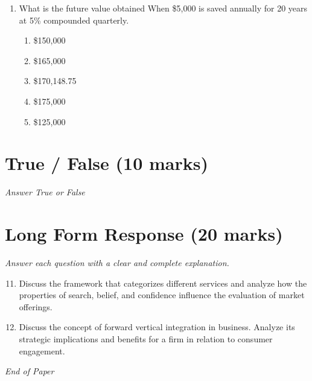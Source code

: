 \documentclass[12pt]{article}
\begin{document}
\begin{enumerate}[label=\arabic*.]
\begin{enumerate}[label=(\alph*)]
    \item Franklin D. Roosevelt
    \item Martin Luther King Jr.
    \item Mikhail Gorbachov
\end{enumerate}
\item What is the future value obtained When \$5,000 is saved annually for 20 years at 5\% compounded quarterly.
\begin{enumerate}[label=(\alph*)]
    \item \$150,000
    \item \$165,000
    \item \$170,148.75
    \item \$175,000
    \item \$125,000
\end{enumerate}
\end{enumerate}

\section*{True / False (10 marks)}
\textit{Answer True or False}

\section*{Long Form Response (20 marks)}
\textit{Answer each question with a clear and complete explanation.}
\begin{enumerate}[label=\arabic*.]
\setcounter{enumi}{10}
\item Discuss the framework that categorizes different services and analyze how the properties of search, belief, and confidence influence the evaluation of market offerings.
\item Discuss the concept of forward vertical integration in business. Analyze its strategic implications and benefits for a firm in relation to consumer engagement.
\end{enumerate}

\vfill
\noindent\textit{End of Paper}
\end{document}

